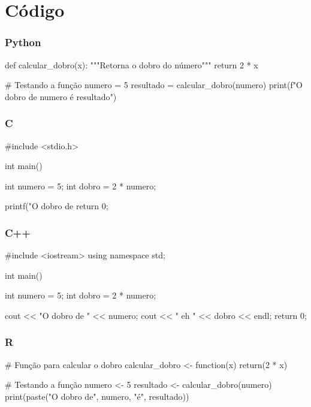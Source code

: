 \section{Código} %

\begin{frame}[fragile]
    \frametitle{Python}
    
    \begin{python}
def calcular_dobro(x):
    """Retorna o dobro do número"""
    return 2 * x

# Testando a função
numero = 5
resultado = calcular_dobro(numero)
print(f"O dobro de {numero} é {resultado}")
    \end{python}
\end{frame}

\begin{frame}[fragile]
    \frametitle{C}
    
    \begin{clang}
#include <stdio.h>

int main() {
    int numero = 5;
    int dobro = 2 * numero;
    
    printf("O dobro de %
    return 0;
}
    \end{clang}
\end{frame}

\begin{frame}[fragile]
    \frametitle{C++}
    
    \begin{cpp}
#include <iostream>
using namespace std;

int main() {
    int numero = 5;
    int dobro = 2 * numero;
    
    cout << "O dobro de " << numero;
    cout << " eh " << dobro << endl;
    return 0;
}
    \end{cpp}
\end{frame}

\begin{frame}[fragile]
    \frametitle{R}
    
    \begin{rlang}
# Função para calcular o dobro
calcular_dobro <- function(x) {
  return(2 * x)
}

# Testando a função
numero <- 5
resultado <- calcular_dobro(numero)
print(paste("O dobro de", numero, "é", resultado))
    \end{rlang}
\end{frame}

